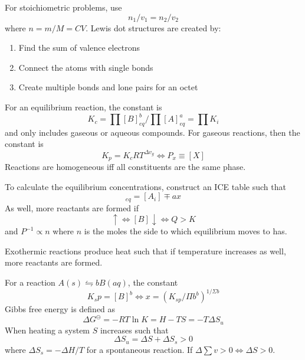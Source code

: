 \documentclass{article}
\begin{document}
\begin{multicols*}{2}


For stoichiometric problems, use
\begin{equation}
  n_1/v_1 = n_2/v_2
\end{equation}
where $n = m/M = CV$. Lewis dot structures are created by:
\begin{enumerate}
  \item Find the sum of valence electrons
  \item Connect the atoms with single bonds
  \item Create multiple bonds and lone pairs for an octet
\end{enumerate}
For an equilibrium reaction, the constant is
\begin{equation}
  K_c = \textstyle\prod [B]_{eq}^b / \textstyle\prod [A]_{eq}^a = \textstyle\prod K_i
\end{equation}
and only includes gaseous or aqueous compounds. For gaseous reactions, then the constant is
\begin{equation}
  K_p = K_c RT ^{\Delta v_g} \iff P_x \equiv [X]
\end{equation}
Reactions are homogeneous iff all constituents are the same phase.

\bigskip
To calculate the equilibrium concentrations, construct an ICE table such that
\begin{equation}
  [X_i]_{eq} = [A_i] \mp ax
\end{equation}
As well, more reactants are formed if
\begin{equation}
  [A] \uparrow \iff [B] \downarrow \iff Q > K
\end{equation}
and $P^{-1} \propto n$ where $n$ is the moles the side to which equilibrium moves to has.

\bigskip
Exothermic reactions produce heat such that if temperature increases as well, more reactants are formed.

\bigskip
For a reaction $A(s) \leftrightharpoons bB(aq)$, the constant
\begin{equation}
  K_sp = [B]^b \iff x = (K_{sp}/\Pi b^b)^{1/\Sigma b}
\end{equation}
Gibbs free energy is defined as
\begin{equation}
  \Delta G^\ominus = -RT \ln K = H - TS = -T \Delta S_u
\end{equation}
When heating a system $S$ increases such that \begin{equation}
  \Delta S_u = \Delta S + \Delta S_s >0
\end{equation}
where $\Delta S_s = - \Delta H/T$ for a spontaneous reaction. If $\Delta \sum v > 0 \iff \Delta S > 0$.


\end{multicols*}
\end{document}
